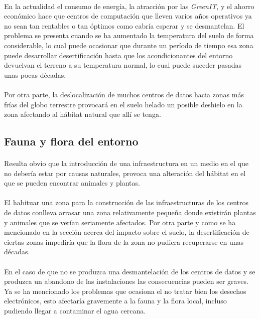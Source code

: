 \documentclass[12pt]{article}
\begin{document}
        \paragraph{}
        En la actualidad el consumo de energía, la atracción por las \textit{GreenIT}, y el ahorro económico hace que centros de computación que lleven varios años operativos ya no sean tan rentables o tan óptimos como cabría esperar y se desmantelan. El problema se presenta cuando se ha aumentado la temperatura del suelo de forma considerable, lo cual puede ocasionar que durante un período de tiempo esa zona puede desarrollar desertificación hasta que los acondicionantes del entorno devuelvan el terreno a su temperatura normal, lo cual puede suceder pasadas unas pocas décadas.
        
        \paragraph{}
        Por otra parte, la deslocalización de muchos centros de datos hacia zonas más frías del globo terrestre provocará en el suelo helado un posible deshielo en la zona afectando al hábitat natural que allí se tenga.
        
	  \subsection{Fauna y flora del entorno}
	  	\paragraph{}
        Resulta obvio que la introducción de una infraestructura en un medio en el que no debería estar por causas naturales, provoca una alteración del hábitat en el que se pueden encontrar animales y plantas.
        
        \paragraph{}
        El habituar una zona para la construcción de las infraestructuras de los centros de datos conlleva arrasar una zona relativamente pequeña donde existirán plantas y animales que se verían seriamente afectados. Por otra parte y como se ha mencionado en la sección acerca del impacto sobre el suelo, la desertificación de ciertas zonas impediría que la flora de la zona no pudiera recuperarse en unas décadas. 
        
        \paragraph{}
        En el caso de que no se produzca una desmantelación de los centros de datos y se produzca un abandono de las instalaciones las consecuencias pueden ser graves. Ya se ha mencionado los problemas que ocasiona el no tratar bien los desechos electrónicos, esto afectaría gravemente a la fauna y la flora local, incluso pudiendo llegar a contaminar el agua cercana.
        
\end{document}
